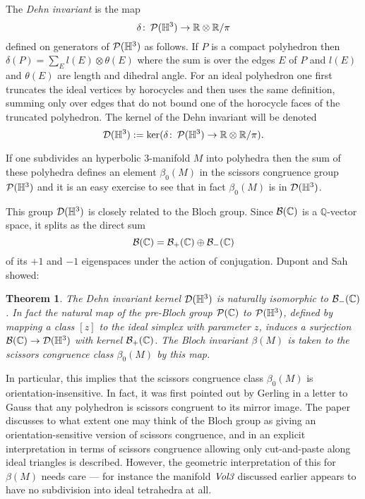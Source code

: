 \documentclass[a4paper]{amsart}
\def\H{{\mathbb H}}
\def\Q{{\mathbb Q}}
\def\R{{\mathbb R}}
\def\C{{\mathbb C}}
\newtheorem{theorem}{Theorem}[section]
\theoremstyle{definition}
\begin{document}
The \emph{Dehn invariant} is the map
$$\delta\colon\sc(\H^3)\to\R\otimes\R/\pi$$ defined on generators of
$\sc(\H^3)$ as follows. If $P$ is a compact polyhedron then
$\delta(P)=\sum_El(E)\otimes\theta(E)$ where the sum is over the edges
$E$ of $P$ and $l(E)$ and $\theta(E)$ are length and dihedral angle.
For an ideal polyhedron one first truncates the ideal vertices by
horocycles and then uses the same definition, summing only over edges
that do not bound one of the horocycle faces of the truncated
polyhedron. The kernel of the Dehn invariant will be denoted
$$\dehnker(\H^3):=\ker(\delta\colon\sc(\H^3)\to\R\otimes\R/\pi).$$ 

If one subdivides an hyperbolic 3-manifold $M$ into polyhedra then the
sum of these polyhedra defines an element $\beta_0(M)$ in the scissors
congruence group $\sc(\H^3)$ and it is an easy exercise to see that in
fact $\beta_0(M)$ is in $\dehnker(\H^3)$. 

This group $\dehnker(\H^3)$ is closely related to the Bloch group.
Since $\Bloch(\C)$ is a $\Q$-vector space, it splits as the direct sum
$$\Bloch(\C)=\Bloch_+(\C)\oplus\Bloch_-(\C)$$ of its $+1$ and $-1$
eigenspaces under the action of conjugation. Dupont and Sah
\cite{dupont-sah} showed:
\begin{theorem} The Dehn invariant kernel
$\dehnker(\H^3)$ is naturally isomorphic to $\Bloch_-(\C)$. In fact
the natural map of the pre-Bloch group $\Prebloch(\C)$ to $\sc(\H^3)$,
defined by mapping a class $[z]$ to the ideal simplex with parameter
$z$, induces a surjection $\Bloch(\C)\to\dehnker(\H^3)$ with kernel
$\Bloch_+(\C)$. The Bloch invariant $\beta(M)$ is taken to the
scissors congruence class $\beta_0(M)$ by this map. \end{theorem}

In particular, this implies that the scissors congruence class
$\beta_0(M)$ is orientation-insensitive. In fact, it was first pointed
out by Gerling in a letter to Gauss that any polyhedron is scissors
congruent to its mirror image. The paper \cite{neumann-hilbert}
discusses to what extent one may think of the Bloch group as giving an
orientation-sensitive version of scissors congruence, and in
\cite{neumann-yang3} an explicit interpretation in terms of scissors
congruence allowing only cut-and-paste along ideal triangles is
described. However, the geometric interpretation of this for
$\beta(M)$ needs care --- for instance the manifold $\vol3$ discussed
earlier appears to have no subdivision into ideal tetrahedra at all. 
\end{document}
